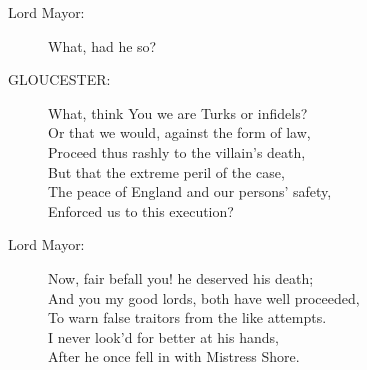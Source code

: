 \documentclass{article}
\begin{document}
\begin{description}
\item[Lord Mayor:] 
\hspace{1pt}What, had he so?\\
\end{description}
\begin{description}
\item[GLOUCESTER:] 
\hspace{1pt}What, think You we are Turks or infidels?\\
\hspace{1pt}Or that we would, against the form of law,\\
\hspace{1pt}Proceed thus rashly to the villain's death,\\
\hspace{1pt}But that the extreme peril of the case,\\
\hspace{1pt}The peace of England and our persons' safety,\\
\hspace{1pt}Enforced us to this execution?\\
\end{description}
\begin{description}
\item[Lord Mayor:] 
\hspace{1pt}Now, fair befall you! he deserved his death;\\
\hspace{1pt}And you my good lords, both have well proceeded,\\
\hspace{1pt}To warn false traitors from the like attempts.\\
\hspace{1pt}I never look'd for better at his hands,\\
\hspace{1pt}After he once fell in with Mistress Shore.\\
\end{description}
\end{document}
